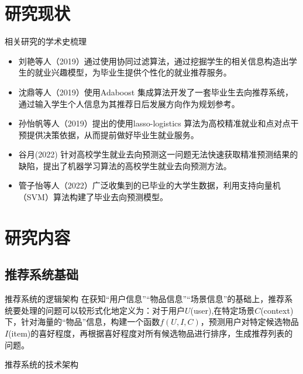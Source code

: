\documentclass{beamer}
\begin{document}
\section{研究现状}
\begin{frame}{相关研究的学术史梳理}
    \begin{itemize}
        \item 刘艳等人（2019）\cite{1}通过使用协同过滤算法，通过挖掘学生的相关信息构造出学生的就业兴趣模型，为毕业生提供个性化的就业推荐服务。
        \item 沈鼎等人（2019）\cite{2}使用Adaboost 集成算法开发了一套毕业生去向推荐系统，通过输入学生个人信息为其推荐日后发展方向作为规划参考。
        \item 孙怡帆等人（2019）\cite{3}提出的使用lasso-logistics 算法为高校精准就业和点对点干预提供决策依据，从而提前做好毕业生就业服务。
        \item 谷月(2022)
        \cite{4}针对高校学生就业去向预测这一问题无法快速获取精准预测结果的缺陷，提出了机器学习算法的高校学生就业去向预测方法。
        \item 管子怡等人（2022）\cite{5}广泛收集到的已毕业的大学生数据，利用支持向量机（SVM）算法构建了毕业去向预测模型。
    \end{itemize}
\end{frame}


\section{研究内容}

\subsection{推荐系统基础}
%
\begin{frame}{推荐系统的逻辑架构}
    在获知“用户信息”“物品信息”“场景信息”的基础上，推荐系统要处理的问题可以较形式化地定义为：对于用户$U$(user),在特定场景$C$(context)下，针对海量的“物品”信息，构建一个函数$f(U,I,C)$，预测用户对特定候选物品$I$(item)的喜好程度，再根据喜好程度对所有候选物品进行排序，生成推荐列表的问题。
\end{frame}
\begin{frame}{推荐系统的技术架构}
	
\end{frame}
\end{document}

